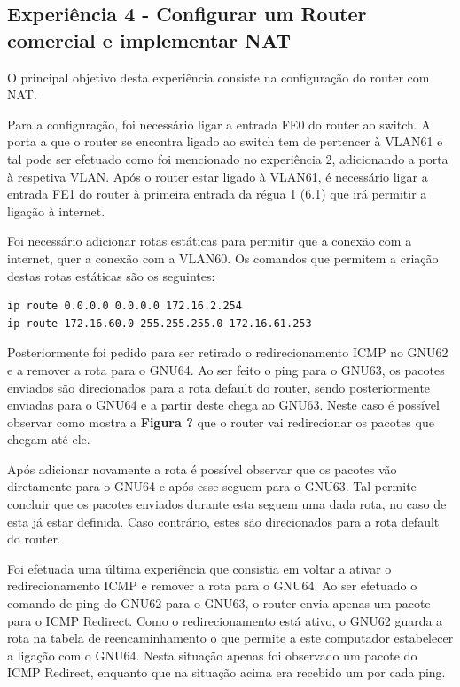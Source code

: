 \documentclass[article, a4paper, 11pt, oneside]{memoir}
\begin{document}
\subsection{Experiência 4 - Configurar um Router comercial e implementar NAT}

O principal objetivo desta experiência consiste na configuração do router com NAT.

Para a configuração, foi necessário ligar a entrada FE0 do router ao switch.
A porta a que o router se encontra ligado ao switch tem de pertencer à VLAN61 e tal pode ser efetuado como foi
mencionado no experiência 2, adicionando a porta à respetiva VLAN. Após o router estar ligado à VLAN61, 
é necessário ligar a entrada FE1 do router à primeira entrada da régua 1 (6.1) que irá permitir a ligação à internet.

Foi necessário adicionar rotas estáticas para permitir que a conexão com a internet, quer a conexão com a VLAN60.
Os comandos que permitem a criação destas rotas estáticas são os seguintes:

\begin{lstlisting} 
ip route 0.0.0.0 0.0.0.0 172.16.2.254
ip route 172.16.60.0 255.255.255.0 172.16.61.253
\end{lstlisting} 

Posteriormente foi pedido para ser retirado o redirecionamento ICMP no GNU62 e a remover a rota para o GNU64.
Ao ser feito o ping para o GNU63, os pacotes enviados são direcionados para a rota default do router, sendo posteriormente enviadas para o GNU64 e a partir deste
chega ao GNU63. Neste caso é possível observar como mostra a \textbf{Figura ?} que o router vai redirecionar os pacotes que chegam até ele. 

Após adicionar novamente a rota é possível observar que os pacotes vão diretamente para o GNU64 e após esse seguem para o GNU63. 
Tal permite concluir que os pacotes enviados durante esta seguem uma dada rota, no caso de esta já estar definida. 
Caso contrário, estes são direcionados para a rota default do router. 

Foi efetuada uma última experiência que consistia em voltar a ativar o redirecionamento ICMP e remover a rota para o GNU64. 
Ao ser efetuado o comando de ping do GNU62 para o GNU63, o router envia apenas um pacote para o ICMP Redirect. Como o redirecionamento está ativo, o
GNU62 guarda a rota na tabela de reencaminhamento o que permite a este computador estabelecer a ligação com o GNU64. Nesta situação apenas foi observado um 
pacote do ICMP Redirect, enquanto que na situação acima era recebido um por cada ping.
\end{document}
